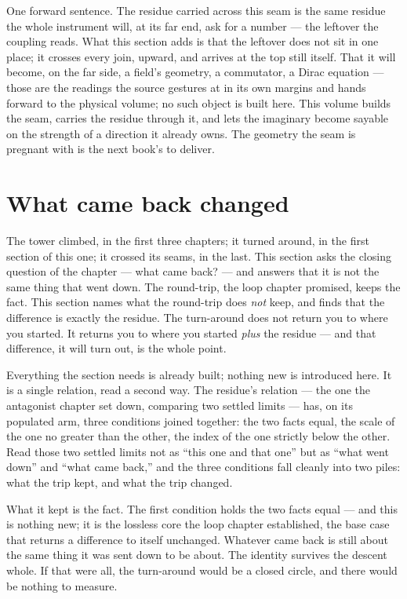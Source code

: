 One forward sentence. The residue carried across this seam is the same residue the whole instrument will, at its far
end, ask for a number --- the leftover the coupling reads. What this section adds is that the leftover does not sit in
one place; it crosses every join, upward, and arrives at the top still itself. That it will become, on the far side, a
field's geometry, a commutator, a Dirac equation --- those are the readings the source gestures at in its own margins
and hands forward to the physical volume; no such object is built here. This volume builds the seam, carries the
residue through it, and lets the imaginary become sayable on the strength of a direction it already owns. The geometry
the seam is pregnant with is the next book's to deliver.

\section{What came back changed}

The tower climbed, in the first three chapters; it turned around, in the first section of this one; it crossed its
seams, in the last. This section asks the closing question of the chapter --- what came back? --- and answers that it
is not the same thing that went down. The round-trip, the loop chapter promised, keeps the fact. This section names
what the round-trip does \emph{not} keep, and finds that the difference is exactly the residue. The turn-around does
not return you to where you started. It returns you to where you started \emph{plus} the residue --- and that
difference, it will turn out, is the whole point.

Everything the section needs is already built; nothing new is introduced here. It is a single relation, read a second
way. The residue's relation --- the one the antagonist chapter set down, comparing two settled limits --- has, on its
populated arm, three conditions joined together: the two facts equal, the scale of the one no greater than the other,
the index of the one strictly below the other. Read those two settled limits not as ``this one and that one'' but as
``what went down'' and ``what came back,'' and the three conditions fall cleanly into two piles: what the trip kept,
and what the trip changed.

What it kept is the fact. The first condition holds the two facts equal --- and this is nothing new; it is the
lossless core the loop chapter established, the base case that returns a difference to itself unchanged. Whatever came
back is still about the same thing it was sent down to be about. The identity survives the descent whole. If that were
all, the turn-around would be a closed circle, and there would be nothing to measure.

